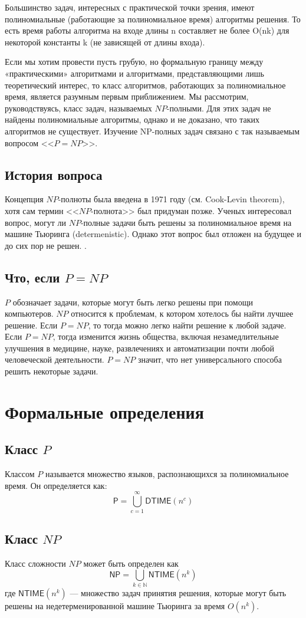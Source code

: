 \documentclass{article}
\begin{document}
Большинство задач, интересных с практической точки зрения, имеют полиномиальные (работающие за полиномиальное время) алгоритмы решения. То есть время работы алгоритма на входе длины n составляет не более O(nk) для некоторой константы k (не зависящей от длины входа)\cite{rain}.

Если мы хотим провести пусть грубую, но формальную границу между «практическими» алгоритмами и алгоритмами, представляющими лишь теоретический интерес, то класс алгоритмов, работающих за полиномиальное время, является разумным первым приближением.
Мы рассмотрим, руководствуясь, класс задач, называемых $NP$-полными.
Для этих задач не найдены полиномиальные алгоритмы, однако и не доказано, что таких алгоритмов не существует.
Изучение NP-полных задач связано с так называемым вопросом <<$P = NP$>>\cite{rain}.

\subsection{История вопроса}

Концепция $NP$-полноты была введена в 1971 году (см. Cook-Levin theorem), хотя сам термин <<$NP$-полнота>> был придуман позже. Ученых интересовал вопрос, могут ли $NP$-полные задачи быть решены за полиномиальное время на машине Тьюринга (determenistic). Однако этот вопрос был отложен на будущее и до сих пор не решен. 
\cite{wikinpcompleteness}.

\subsection{Что, если $P=NP$}
$P$ обозначает задачи, которые могут быть легко решены при помощи компьютеров. $NP$ относится к проблемам, к котором хотелось бы найти лучшее решение. Если $P=NP$, то тогда можно легко найти решение к любой задаче. Если $P=NP$, тогда изменится жизнь общества, включая незамедлительные улучшения в медицине, науке, развлечениях и автоматизации почти любой человеческой деятельности.
$P=NP$ значит, что нет универсального способа решить некоторые задачи.
\cite{goldenticket}

\section{Формальные определения}
\subsection{Класс $P$}
Классом $P$ называется множество языков, распознающихся за полиномиальное время. Он определяется как:
$$
\mathsf{P}=\bigcup_{c=1}^\infty \mathsf{DTIME}(n^c)
$$ 
\cite{musatov}

\subsection{Класс $NP$}
Класс сложности $NP$ может быть определен как
$$
\mathsf{NP} = \bigcup_{k\in\mathbb{N}} \mathsf{NTIME}(n^k)
$$
где
$\mathsf{NTIME}(n^k)$ --- множество задач принятия решения, которые могут быть решены на недетерменированной машине Тьюринга за время $O(n^k)$\cite{wikiclassnp}.

\printbibliography
%
%
\end{document}
